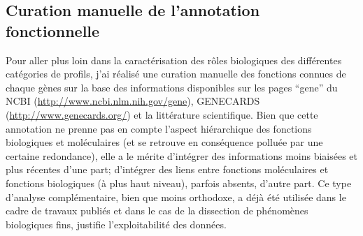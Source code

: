 \documentclass[../main.tex]{subfiles}
\begin{document}
	\subsection{Curation manuelle de l'annotation fonctionnelle}\label{subsec:manual-annot}
		Pour aller plus loin dans la caractérisation des rôles biologiques des différentes catégories de profils, j'ai réalisé une curation manuelle des fonctions connues de chaque gènes sur la base des informations disponibles sur les pages ``gene'' du NCBI (\url{http://www.ncbi.nlm.nih.gov/gene}), GENECARDS (\url{http://www.genecards.org/}) et la littérature scientifique.
		Bien que cette annotation ne prenne pas en compte l'aspect hiérarchique des fonctions biologiques et moléculaires (et se retrouve en conséquence polluée par une certaine redondance), elle a le mérite d'intégrer des informations moins biaisées et plus récentes d'une part; d'intégrer des liens entre fonctions moléculaires et fonctions biologiques (à plus haut niveau), parfois absents, d'autre part.
		Ce type d'analyse complémentaire, bien que moins orthodoxe, a déjà été utilisée dans le cadre de travaux publiés \citep{Hendrix2008} et dans le cas de la dissection de phénomènes biologiques fins, justifie l'exploitabilité des données.
\end{document}
